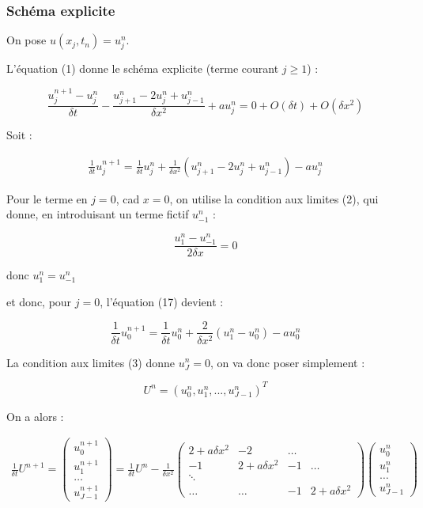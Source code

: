 \documentclass[french]{article}
\begin{document}
\subsubsection{Schéma explicite}

On pose $ u(x_{j},t_{n}) = u_{j}^{n} $.

L'équation (1) donne le schéma explicite (terme courant $ j \geq 1 $) :

\[
\frac{u_{j}^{n+1}-u_{j}^{n}}{\delta t}-\frac{u_{j+1}^{n}-2u_{j}^{n}+u_{j-1}^{n}}{\delta x^{2}}+au_{j}^{n}=0+O(\delta t)+O(\delta x^{2})
\]

Soit :

\begin{align}
\frac{1}{\delta t}u_{j}^{n+1}=\frac{1}{\delta t}u_{j}^{n}+
\frac{1}{\delta x^{2}}\left(u_{j+1}^{n}-2u_{j}^{n}+u_{j-1}^{n} \right)-au_{j}^{n}
\end{align}

Pour le terme en $ j=0 $, cad $ x=0 $, on utilise la condition aux limites (2), qui donne, en introduisant un terme fictif $ u_{-1}^{n} $ :

\[
\frac{u_{1}^{n}-u_{-1}^{n}}{2 \delta x} = 0
\]

donc $ u_{1}^{n} = u_{-1}^{n} $

et donc, pour $ j=0 $, l'équation (17) devient :

\[
\frac{1}{\delta t}u_{0}^{n+1}=\frac{1}{\delta t}u_{0}^{n}+
\frac{2}{\delta x^{2}}\left(u_{1}^{n}-u_{0}^{n} \right)-au_{0}^{n}
\]

La condition aux limites (3) donne $ u_{J}^{n}=0 $, on va donc poser simplement :

\[
U^{n}=(u_{0}^{n}, u_{1}^{n}, ... ,u_{J-1}^{n})^{T}
\]

On a alors :

\begin{align}
\frac{1}{\delta t}U^{n+1}=
\begin{pmatrix}
u_{0}^{n+1} \\ u_{1}^{n+1} \\ \hdots \\ u_{J-1}^{n+1}
\end{pmatrix} =
\frac{1}{\delta t}U^{n}
- \frac{1}{\delta x^{2}}
\begin{pmatrix}
2+a\delta x^{2} & -2 & \hdots \\
-1 & 2+a\delta x^{2} & -1 & \hdots \\
\ddots \\
\hdots & \hdots & -1 & 2+a\delta x^{2} 
\end{pmatrix}
\begin{pmatrix}
u_{0}^{n} \\ u_{1}^{n} \\ \hdots \\ u_{J-1}^{n}
\end{pmatrix}
\end{align}
\end{document}
